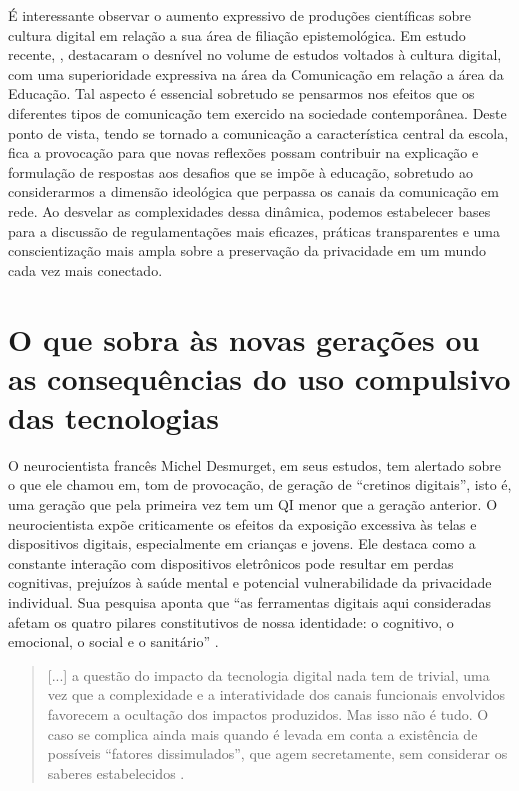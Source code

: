 \documentclass[portuguese]{textolivre}
\begin{document}
É interessante observar o aumento expressivo de produções científicas sobre cultura digital em relação a sua área de filiação epistemológica. Em estudo recente, \textcite{pereira_fas_2023}, destacaram o desnível no volume de estudos voltados à cultura digital, com uma superioridade expressiva na área da Comunicação em relação a área da Educação. Tal aspecto é essencial sobretudo se pensarmos nos efeitos que os diferentes tipos de comunicação tem exercido na sociedade contemporânea. Deste ponto de vista, tendo se tornado a comunicação a característica central da escola, fica a provocação para que novas reflexões possam contribuir na explicação e formulação de respostas aos desafios que se impõe à educação, sobretudo ao considerarmos a dimensão ideológica que perpassa os canais da comunicação em rede. Ao desvelar as complexidades dessa dinâmica, podemos estabelecer bases para a discussão de regulamentações mais eficazes, práticas transparentes e uma conscientização mais ampla sobre a preservação da privacidade em um mundo cada vez mais conectado.


\section{O que sobra às novas gerações ou as consequências do uso compulsivo das tecnologias}\label{sec-conduta}
O neurocientista francês Michel Desmurget, em seus estudos, tem alertado sobre o que ele chamou em, tom de provocação, de geração de “cretinos digitais”, isto é, uma geração que pela primeira vez tem um QI menor que a geração anterior. O neurocientista expõe criticamente os efeitos da exposição excessiva às telas e dispositivos digitais, especialmente em crianças e jovens. Ele destaca como a constante interação com dispositivos eletrônicos pode resultar em perdas cognitivas, prejuízos à saúde mental e potencial vulnerabilidade da privacidade individual. Sua pesquisa aponta que “as ferramentas digitais aqui consideradas afetam os quatro pilares constitutivos de nossa identidade: o cognitivo, o emocional, o social e o sanitário” \cite[p. 58]{desmurget_fabrica_2021}.

\begin{quote}
    [...] a questão do impacto da tecnologia digital nada tem de trivial, uma vez que a complexidade e a interatividade dos canais funcionais envolvidos favorecem a ocultação dos impactos produzidos. Mas isso não é tudo. O caso se complica ainda mais quando é levada em conta a existência de possíveis “fatores dissimulados”, que agem secretamente, sem considerar os saberes estabelecidos \cite[p. 60]{desmurget_fabrica_2021}.
\end{quote}
\end{document}
